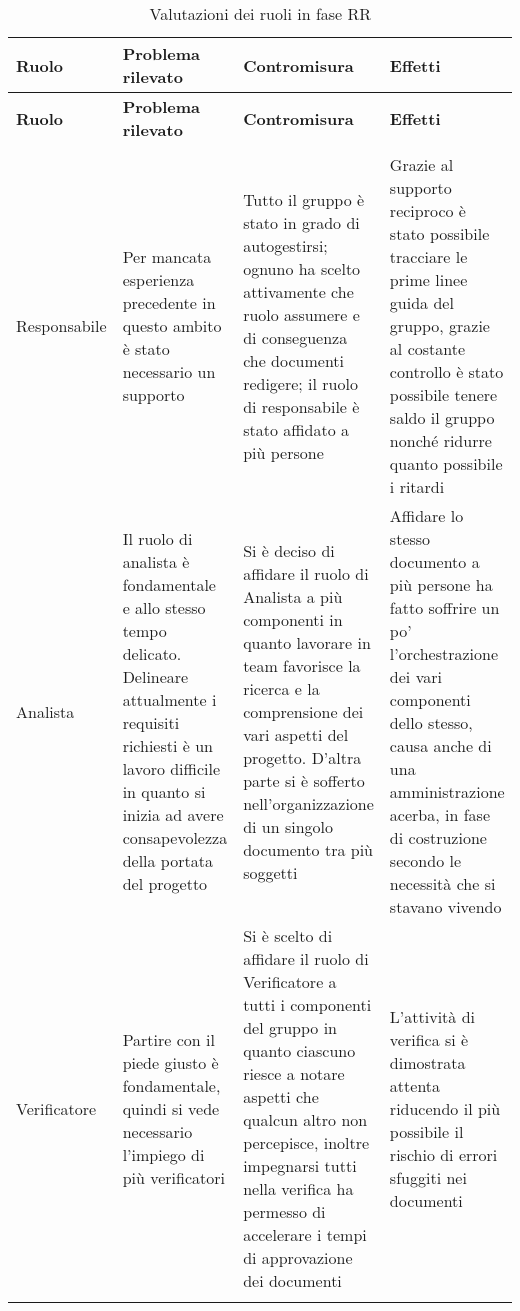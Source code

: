 \documentclass[../piano_di_qualifica.tex]{subfiles}
\begin{document}
\begin{center}
	\begin{longtable}{|p{2.5cm}|p{4.5cm}|p{4.5cm}|p{4.5cm}|}
		\hline
		\rowcolor{lightgray}
		{\textbf{Ruolo}} & {\textbf{Problema rilevato}} & {\textbf{Contromisura}} & {\textbf{Effetti}} \\
		\hline
		\endfirsthead
		\hline
		\rowcolor{lightgray}
		{\textbf{Ruolo}} & {\textbf{Problema rilevato}} & {\textbf{Contromisura}} & {\textbf{Effetti}} \\
		\hline
		\endhead

		\hline
		\rowcolor{white}
		\multicolumn{3}{|c|}{\emph{Continua alla pagina successiva...}} \\
		\hline
		\endfoot
		\endlastfoot

		Responsabile & Per mancata esperienza precedente in questo ambito è stato necessario un supporto & Tutto il gruppo è stato in grado di autogestirsi; ognuno ha scelto attivamente che ruolo assumere e di conseguenza che documenti redigere; il ruolo di responsabile è stato affidato a più persone & Grazie al supporto reciproco è stato possibile tracciare le prime linee guida del gruppo, grazie al costante controllo è stato possibile tenere saldo il gruppo nonché ridurre quanto possibile i ritardi \\
		Analista & Il ruolo di analista è fondamentale e allo stesso tempo delicato. Delineare attualmente i requisiti richiesti è un lavoro difficile in quanto si inizia ad avere consapevolezza della portata del progetto & Si è deciso di affidare il ruolo di Analista a più componenti in quanto lavorare in team favorisce la ricerca e la comprensione dei vari aspetti del progetto. D'altra parte si è sofferto nell'organizzazione di un singolo documento tra più soggetti & Affidare lo stesso documento a più persone ha fatto soffrire un po’ l’orchestrazione dei vari componenti dello stesso, causa anche di una amministrazione acerba, in fase di costruzione secondo le necessità che si stavano vivendo \\
		Verificatore & Partire con il piede giusto è fondamentale, quindi si vede necessario l'impiego di più verificatori & Si è scelto di affidare il ruolo di Verificatore a tutti i componenti del gruppo in quanto ciascuno riesce a notare aspetti che qualcun altro non percepisce, inoltre impegnarsi tutti nella verifica ha permesso di accelerare i tempi di approvazione dei documenti & L’attività di verifica si è dimostrata attenta riducendo il più possibile il rischio di errori sfuggiti nei documenti \\
		\hline
		\rowcolor{white}
		\caption{Valutazioni dei ruoli in fase RR}
	\end{longtable}
\end{center}
\end{document}
